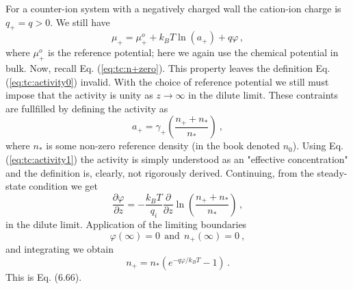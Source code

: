 \documentclass[11pt]{article}
\begin{document}
For a counter-ion system with a negatively charged wall the cation-ion charge is  $q_+ = q > 0$. We 
still have
\begin{equation}
	\mu_+ = \mu_+^o + k_BT \ln(a_+) + q\varphi \, ,
\end{equation}
where $\mu_+^o$ is the reference potential; here we again use the chemical potential in bulk. Now, 
recall Eq. (\ref{eq:tc:n+zero}). This property leaves the definition Eq. (\ref{eq:tc:activity0}) 
invalid. With the choice of reference potential we still must impose that the 
activity is unity as $z \rightarrow \infty$ in the dilute limit. These contraints are fullfilled 
by defining the activity as 
\begin{equation}
	\label{eq:tc:activity1}
	a_+ = \gamma_+ \left(\frac{n_+ + n_*}{n_*} \right)\ ,
\end{equation}
where $n_*$ is some non-zero reference density (in the book denoted $n_0$). Using Eq. 
(\ref{eq:tc:activity1}) the activity is simply understood as an "effective 
concentration" and the definition is, clearly, not rigorously derived. Continuing, from the 
steady-state condition we get 
\begin{equation}
	\frac{\partial \varphi}{\partial z} = -\frac{k_BT}{q_i}\frac{\partial}{\partial z} \ln 
	\left( \frac{n_+ + n_*}{n_*} \right) \, ,
\end{equation}	
in the dilute limit. Application of the limiting boundaries 
\begin{equation}
	\varphi(\infty) = 0 \ \ \text{and} \ \ n_+(\infty) = 0 \ ,
\end{equation}
and integrating we obtain
\begin{equation}
	n_+ = n_*(e^{-q\varphi/k_BT} -1) \, .
\end{equation}
This is Eq. (6.66). 
\end{document}
